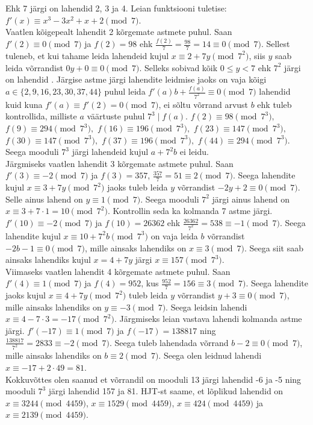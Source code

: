 \documentclass[a4paper, 10pt]{article}
\begin{document}
Ehk 7 järgi on lahendid 2, 3 ja 4. Leian funktsiooni tuletise: $f'(x)\equiv x^3-3x^2+x+2\pmod7$.\\
Vaatlen kõigepealt lahendit 2 kõrgemate astmete puhul. Saan $f'(2)\equiv0\pmod7$ ja $f(2)=98$ ehk $\frac{f(2)}{7}=\frac{98}{7}=14\equiv0\pmod7$. Sellest tuleneb, et kui tahame leida lahendeid kujul $x\equiv2+7y\pmod{7^2}$, siis $y$ saab leida võrrandist $0y+0\equiv0\pmod{7}$. Selleks sobivad kõik $0\leq y<7$ ehk $7^2$ järgi on lahendid . Järgise astme järgi lahendite leidmise jaoks on vaja kõigi $a\in\{2,9,16,23,30,37,44\}$ puhul leida \mbox{$f'(a)b+\frac{f(a)}{7^2}\equiv0\pmod7$} lahendid kuid kuna $f'(a)\equiv f'(2)=0\pmod7$, ei sõltu võrrand arvust $b$ ehk tuleb kontrollida, milliste $a$ väärtuste puhul $7^3\mid f(a)$. $f(2)\equiv98\pmod{7^3},$ \mbox{$f(9)\equiv294\pmod{7^3},$} \mbox{$f(16)\equiv196\pmod{7^3},$} $f(23)\equiv147\pmod{7^3},$ $f(30)\equiv147\pmod{7^3},$ \mbox{$f(37)\equiv196\pmod{7^3},$} \mbox{$f(44)\equiv294\pmod{7^3}$}. Seega mooduli $7^3$ järgi lahendeid kujul $a+7^2b$ ei leidu.\\

Järgmiseks vaatlen lahendit 3 kõrgemate astmete puhul. Saan $f'(3)\equiv-2\pmod7$ ja $f(3)=357$, $\frac{357}{7}=51\equiv2\pmod7$. Seega lahendite kujul $x\equiv3+7y\pmod{7^2}$ jaoks tuleb leida $y$ võrrandist $-2y+2\equiv0\pmod7$. Selle ainus lahend on $y\equiv1\pmod7$. Seega mooduli $7^2$ järgi ainus lahend on $x\equiv3+7\cdot1=10\pmod{7^2}$. Kontrollin seda ka kolmanda 7 astme järgi. $f'(10)\equiv-2\pmod7$ ja $f(10)=26362$ ehk $\frac{26362}{7^2}=538\equiv-1\pmod7$. Seega lahendite kujul $x\equiv10+7^2b\pmod{7^3}$ on vaja leida $b$ võrrandist $-2b-1\equiv0\pmod{7}$, mille ainsaks lahendiks on $x\equiv3\pmod{7}$. Seega siit saab ainsaks lahendiks kujul $x=4+7y$ järgi $x\equiv157\pmod{7^3}$.\\

Viimaseks vaatlen lahendit 4 kõrgemate astmete puhul. Saan $f'(4)\equiv1\pmod7$ ja $f(4)=952$, kus $\frac{952}{7}=156\equiv3\pmod7$. Seega lahendite jaoks kujul $x\equiv4+7y\pmod{7^2}$ tuleb leida $y$ võrrandist \mbox{$y+3\equiv0\pmod7$}, mille ainsaks lahendiks on $y\equiv-3\pmod7$. Seega leidsin lahendi \mbox{$x\equiv4-7\cdot3=-17\pmod{7^2}$}. Järgmiseks leian vastava lahendi kolmanda astme järgi. $f'(-17)\equiv1\pmod7$ ja $f(-17)=138817$ ning $\frac{138817}{7^2}=2833\equiv-2\pmod7$. Seega tuleb lahendada võrrand $b-2\equiv0\pmod7$, mille ainsaks lahendiks on $b\equiv2\pmod7$. Seega olen leidnud lahendi $x\equiv-17+2\cdot49=81$.\\

Kokkuvõttes olen saanud et võrrandil on mooduli 13 järgi lahendid -6 ja -5 ning mooduli $7^3$ järgi lahendid 157 ja 81. HJT-st saame, et lõplikud lahendid on $x\equiv3244\pmod{4459}$, $x\equiv1529\pmod{4459}$, $x\equiv424\pmod{4459}$ ja $x\equiv2139\pmod{4459}$.
\end{document}
